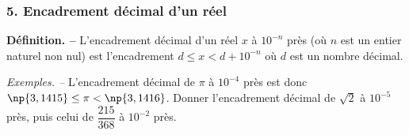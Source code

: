 \documentclass[handout]{beamer}
\begin{document}
\begin{frame}
  \frametitle{5. Encadrement décimal d'un réel}

  \textbf{Définition. --} L'encadrement décimal d'un réel $x$ à $10^{-n}$ près\pause{} (où $n$ est un entier naturel non nul)\pause{} est l'encadrement $d\leq x<d+10^{-n}$\pause{} où $d$ est un nombre décimal.\pause{}

  \bigskip

  \textit{Exemples. --} L'encadrement décimal de $\pi$ à $10^{-4}$ près est donc\pause{} $\np{3,1415}\leq\pi<\np{3,1416}$.\pause{}
  Donner l'encadrement décimal de $\sqrt{2}$ à $10^{-5}$ près, puis celui de $\dfrac{215}{368}$ à $10^{-2}$ près.
\end{frame}
\end{document}
